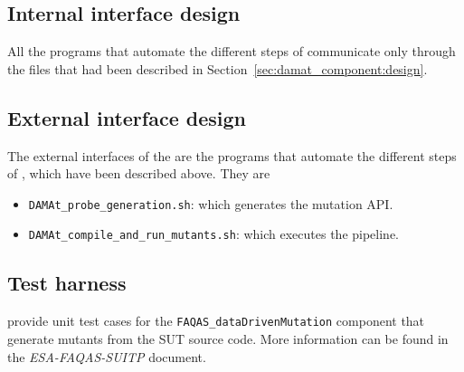 \subsection{Internal interface design}



All the programs that automate the different steps of \dama communicate only through the files that had been described in Section~\ref{sec:damat_component:design}.

\subsection{External interface design}

The external interfaces of the \dama are the programs that automate the different steps of \dama, which have been described above. They are

\begin{itemize}
  \item \texttt{DAMAt\_probe\_generation.sh}: which generates the mutation API.
	\item \texttt{DAMAt\_compile\_and\_run\_mutants.sh}: which executes the \dama pipeline.
\end{itemize}

\subsection{Test harness}

\dama provide unit test cases for the \texttt{FAQAS\_dataDrivenMutation} component that generate mutants from the SUT source code. More information can be found in the \textit{ESA-FAQAS-SUITP} document.
